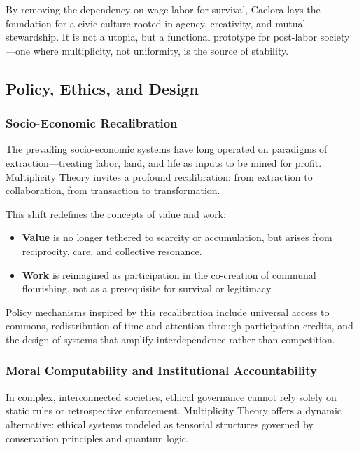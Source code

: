 \documentclass{article}
\theoremstyle{plain}
\theoremstyle{claimstyle}
\begin{document}
By removing the dependency on wage labor for survival, Caelora lays the foundation for a civic culture rooted in agency, creativity, and mutual stewardship. It is not a utopia, but a functional prototype for post-labor society—one where multiplicity, not uniformity, is the source of stability.

\subsection{Policy, Ethics, and Design}

\subsubsection{Socio-Economic Recalibration}

The prevailing socio-economic systems have long operated on paradigms of extraction—treating labor, land, and life as inputs to be mined for profit. Multiplicity Theory invites a profound recalibration: from extraction to collaboration, from transaction to transformation.

This shift redefines the concepts of value and work:

\begin{itemize}
    \item \textbf{Value} is no longer tethered to scarcity or accumulation, but arises from reciprocity, care, and collective resonance.
    \item \textbf{Work} is reimagined as participation in the co-creation of communal flourishing, not as a prerequisite for survival or legitimacy.
\end{itemize}

Policy mechanisms inspired by this recalibration include universal access to commons, redistribution of time and attention through participation credits, and the design of systems that amplify interdependence rather than competition.

\subsubsection{Moral Computability and Institutional Accountability}

In complex, interconnected societies, ethical governance cannot rely solely on static rules or retrospective enforcement. Multiplicity Theory offers a dynamic alternative: ethical systems modeled as tensorial structures governed by conservation principles and quantum logic.
\end{document}
